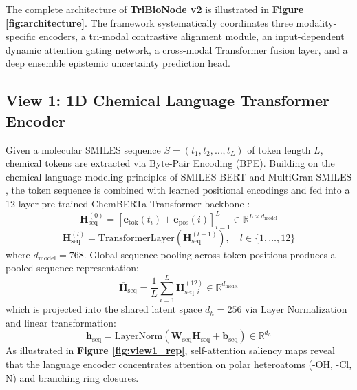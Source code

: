 \documentclass[10pt,twocolumn]{article}
\begin{document}
The complete architecture of \textbf{TriBioNode v2} is illustrated in \textbf{Figure \ref{fig:architecture}}. The framework systematically coordinates three modality-specific encoders, a tri-modal contrastive alignment module, an input-dependent dynamic attention gating network, a cross-modal Transformer fusion layer, and a deep ensemble epistemic uncertainty prediction head.

\subsection{View 1: 1D Chemical Language Transformer Encoder}

Given a molecular SMILES sequence $S = (t_1, t_2, \dots, t_L)$ of token length $L$, chemical tokens are extracted via Byte-Pair Encoding (BPE). Building on the chemical language modeling principles of SMILES-BERT \cite{wang2019smiles} and MultiGran-SMILES \cite{jiang2022multigran}, the token sequence is combined with learned positional encodings and fed into a 12-layer pre-trained ChemBERTa Transformer backbone \cite{chithrananda2020chemberta}:
\begin{equation}
\mathbf{H}_{\text{seq}}^{(0)} = \left[\mathbf{e}_{\text{tok}}(t_i) + \mathbf{e}_{\text{pos}}(i)\right]_{i=1}^L \in \mathbb{R}^{L \times d_{\text{model}}}
\label{eq:seq_emb}
\end{equation}
\begin{equation}
\mathbf{H}_{\text{seq}}^{(l)} = \text{TransformerLayer}\left(\mathbf{H}_{\text{seq}}^{(l-1)}\right), \quad l \in \{1, \dots, 12\}
\label{eq:seq_prop}
\end{equation}
where $d_{\text{model}} = 768$. Global sequence pooling across token positions produces a pooled sequence representation:
\begin{equation}
\overline{\mathbf{H}}_{\text{seq}} = \frac{1}{L} \sum_{i=1}^L \mathbf{H}_{\text{seq}, i}^{(12)} \in \mathbb{R}^{d_{\text{model}}}
\end{equation}
which is projected into the shared latent space $d_h = 256$ via Layer Normalization and linear transformation:
\begin{equation}
\mathbf{h}_{\text{seq}} = \text{LayerNorm}\left(\mathbf{W}_{\text{seq}} \overline{\mathbf{H}}_{\text{seq}} + \mathbf{b}_{\text{seq}}\right) \in \mathbb{R}^{d_h}
\label{eq:seq_pool}
\end{equation}
As illustrated in \textbf{Figure \ref{fig:view1_rep}}, self-attention saliency maps reveal that the language encoder concentrates attention on polar heteroatoms ($\text{-OH}$, $\text{-Cl}$, $\text{N}$) and branching ring closures.
\end{document}
